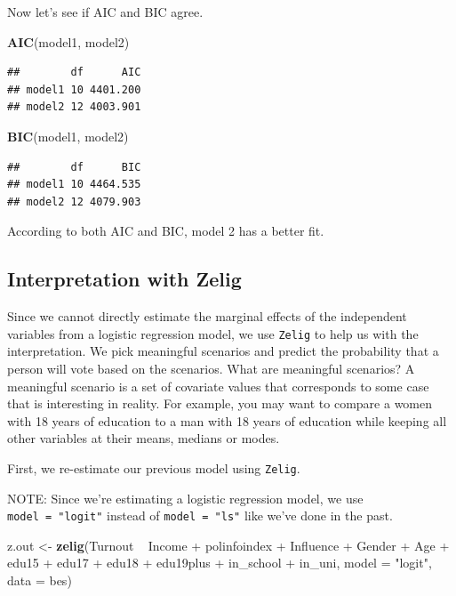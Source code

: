 \documentclass[]{article}
\newenvironment{Shaded}{\begin{snugshade}}{\end{snugshade}}
\newcommand{\KeywordTok}[1]{\textcolor[rgb]{0.13,0.29,0.53}{\textbf{{#1}}}}
\newcommand{\DataTypeTok}[1]{\textcolor[rgb]{0.13,0.29,0.53}{{#1}}}
\newcommand{\StringTok}[1]{\textcolor[rgb]{0.31,0.60,0.02}{{#1}}}
\newcommand{\NormalTok}[1]{{#1}}
\theoremstyle{definition}
\theoremstyle{definition}
\theoremstyle{remark}
\begin{document}
Now let's see if AIC and BIC agree.

\begin{Shaded}
\begin{Highlighting}[]
\KeywordTok{AIC}\NormalTok{(model1, model2)}
\end{Highlighting}
\end{Shaded}

\begin{verbatim}
##        df      AIC
## model1 10 4401.200
## model2 12 4003.901
\end{verbatim}

\begin{Shaded}
\begin{Highlighting}[]
\KeywordTok{BIC}\NormalTok{(model1, model2) }
\end{Highlighting}
\end{Shaded}

\begin{verbatim}
##        df      BIC
## model1 10 4464.535
## model2 12 4079.903
\end{verbatim}

According to both AIC and BIC, model 2 has a better fit.

\subsection{Interpretation with Zelig}\label{interpretation-with-zelig}

Since we cannot directly estimate the marginal effects of the
independent variables from a logistic regression model, we use
\texttt{Zelig} to help us with the interpretation. We pick meaningful
scenarios and predict the probability that a person will vote based on
the scenarios. What are meaningful scenarios? A meaningful scenario is a
set of covariate values that corresponds to some case that is
interesting in reality. For example, you may want to compare a women
with 18 years of education to a man with 18 years of education while
keeping all other variables at their means, medians or modes.

First, we re-estimate our previous model using \texttt{Zelig}.

NOTE: Since we're estimating a logistic regression model, we use
\texttt{model\ =\ "logit"} instead of \texttt{model\ =\ "ls"} like we've
done in the past.

\begin{Shaded}
\begin{Highlighting}[]
\NormalTok{z.out <-}\StringTok{ }\KeywordTok{zelig}\NormalTok{(Turnout ~}\StringTok{ }\NormalTok{Income +}\StringTok{ }\NormalTok{polinfoindex +}\StringTok{ }\NormalTok{Influence +}\StringTok{ }\NormalTok{Gender +}\StringTok{ }\NormalTok{Age +}\StringTok{ }
\StringTok{                 }\NormalTok{edu15 +}\StringTok{ }\NormalTok{edu17 +}\StringTok{ }\NormalTok{edu18 +}\StringTok{ }\NormalTok{edu19plus +}\StringTok{ }\NormalTok{in_school +}\StringTok{ }\NormalTok{in_uni, }
               \DataTypeTok{model =} \StringTok{"logit"}\NormalTok{, }
               \DataTypeTok{data =} \NormalTok{bes)}
\end{Highlighting}
\end{Shaded}
\end{document}
